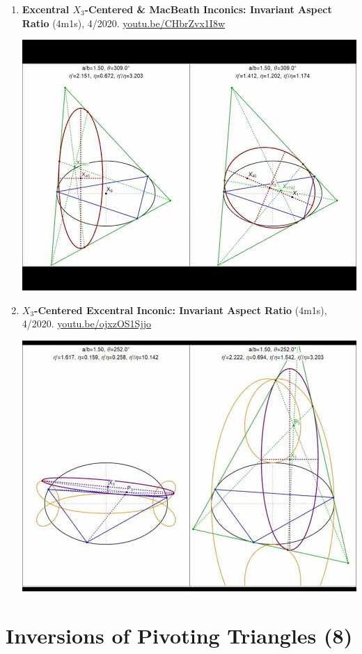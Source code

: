 \documentclass[12pt]{article}
\begin{document}
\begin{enumerate}[resume]
% 
\item \textbf{Excentral $X_{3}$-Centered \& MacBeath Inconics: Invariant Aspect Ratio} (4m1s), 4/2020. \href{https://youtu.be/CHbrZvx1I8w}{\url{youtu.be/CHbrZvx1I8w}}
\begin{center}\includegraphics[width=.5\textwidth]{pics/CHbrZvx1I8w.jpg}\end{center}
% 
\item \textbf{$X_{3}$-Centered Excentral Inconic: Invariant Aspect Ratio} (4m1s), 4/2020. \href{https://youtu.be/ojxzOS1Sjjo}{\url{youtu.be/ojxzOS1Sjjo}}
\begin{center}\includegraphics[width=.5\textwidth]{pics/ojxzOS1Sjjo.jpg}\end{center}
% 
\end{enumerate}

\section{Inversions of Pivoting Triangles (8)}
\end{document}
